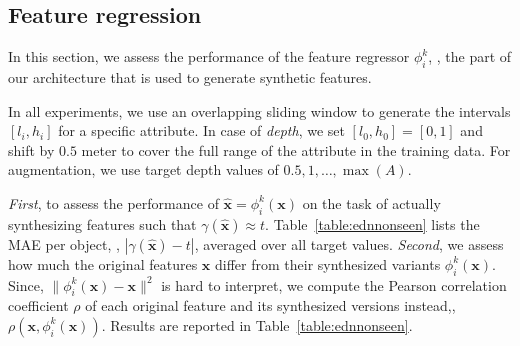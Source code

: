 \documentclass[10pt,twocolumn,letterpaper]{article}
\begin{document}
\subsection{Feature regression}
\label{subsection:EvalFeatureRegression}

In this section, we assess the performance of the feature regressor 
$\phi_i^k$, \ie, the part of our architecture that is used to generate 
synthetic features.

In all experiments, we use an overlapping sliding window to
generate the intervals $[l_i,h_i]$ for a specific attribute. In case
of \emph{depth}, we set $[l_0,h_0] = [0,1]$ and shift by $0.5$ meter
to cover the full range of the attribute in the training data. For
augmentation, we use target depth values of $0.5, 1, \ldots, \max(A)$.

\emph{First}, to assess the performance of $\hat{\mathbf{x}} = \phi_i^k(\mathbf{x})$
on the task of actually synthesizing features such that $\gamma(\hat{\mathbf{x}}) \approx t$. 
Table~\ref{table:ednnonseen} lists the MAE per object, \ie, $|\gamma(\hat{\mathbf{x}}) -t|$, 
averaged over all target values. \emph{Second}, we assess how much 
the original features $\mathbf{x}$ differ from their synthesized variants
$\phi_i^k(\mathbf{x})$. Since, $\|\phi_i^k(\mathbf{x})-\mathbf{x}\|^2$ is 
hard to interpret, we compute the Pearson correlation coefficient $\rho$ of each original
feature and its synthesized versions instead,\ie, $\rho(\mathbf{x},\phi_i^k(\mathbf{x}))$.
 Results are reported in Table~\ref{table:ednnonseen}.
\begin{table}[t!]
\small
{}
\caption{\label{table:ednnonseen}Quality assessment of $\phi(\mathbf{x})$ on a 
selection of 10 \emph{unseen objects}: for each object, 
$\rho$ lists the average Pearson correlation of all original features
from that object with respect to the corresponding synthesized features. 
The \emph{depth} column lists the average MAE of 
the predicted attribute value with respect to the desired target 
values.}
\end{table}
\end{document}
